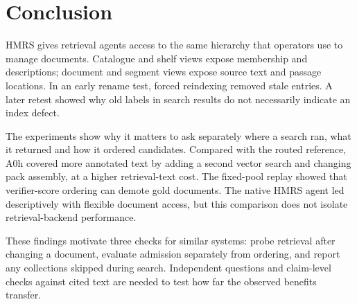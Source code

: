 \section{Conclusion}
\label{sec:conclusion}
HMRS gives retrieval agents access to the same hierarchy that operators use
to manage documents. Catalogue and shelf views expose membership and
descriptions; document and segment views expose source text and passage
locations. In an early rename test, forced reindexing removed stale
entries. A later retest showed why old labels in search results do not
necessarily indicate an index defect.

The experiments show why it matters to ask separately where a search ran,
what it returned and how it ordered candidates. Compared with the routed
reference, A0h covered more annotated text by adding a second vector search
and changing pack assembly, at a higher retrieval-text cost. The fixed-pool
replay showed that verifier-score ordering can demote gold documents. The
native HMRS agent led descriptively with flexible document access, but this
comparison does not isolate retrieval-backend performance.

These findings motivate three checks for similar systems: probe retrieval
after changing a document, evaluate admission separately from ordering,
and report any collections skipped during search. Independent questions
and claim-level checks against cited text are needed to test how far the
observed benefits transfer.
